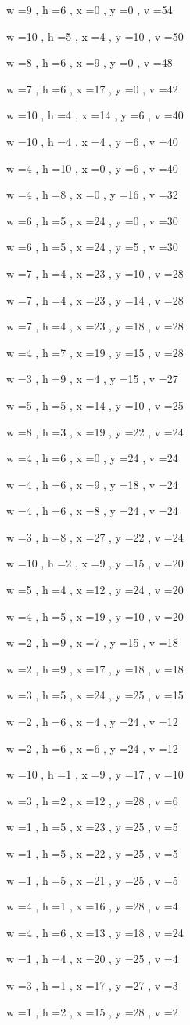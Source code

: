 \documentclass[11pt]{article}
\begin{document}
w =9 , h =6 , x =0 , y =0 , v =54
\par
w =10 , h =5 , x =4 , y =10 , v =50
\par
w =8 , h =6 , x =9 , y =0 , v =48
\par
w =7 , h =6 , x =17 , y =0 , v =42
\par
w =10 , h =4 , x =14 , y =6 , v =40
\par
w =10 , h =4 , x =4 , y =6 , v =40
\par
w =4 , h =10 , x =0 , y =6 , v =40
\par
w =4 , h =8 , x =0 , y =16 , v =32
\par
w =6 , h =5 , x =24 , y =0 , v =30
\par
w =6 , h =5 , x =24 , y =5 , v =30
\par
w =7 , h =4 , x =23 , y =10 , v =28
\par
w =7 , h =4 , x =23 , y =14 , v =28
\par
w =7 , h =4 , x =23 , y =18 , v =28
\par
w =4 , h =7 , x =19 , y =15 , v =28
\par
w =3 , h =9 , x =4 , y =15 , v =27
\par
w =5 , h =5 , x =14 , y =10 , v =25
\par
w =8 , h =3 , x =19 , y =22 , v =24
\par
w =4 , h =6 , x =0 , y =24 , v =24
\par
w =4 , h =6 , x =9 , y =18 , v =24
\par
w =4 , h =6 , x =8 , y =24 , v =24
\par
w =3 , h =8 , x =27 , y =22 , v =24
\par
w =10 , h =2 , x =9 , y =15 , v =20
\par
w =5 , h =4 , x =12 , y =24 , v =20
\par
w =4 , h =5 , x =19 , y =10 , v =20
\par
w =2 , h =9 , x =7 , y =15 , v =18
\par
w =2 , h =9 , x =17 , y =18 , v =18
\par
w =3 , h =5 , x =24 , y =25 , v =15
\par
w =2 , h =6 , x =4 , y =24 , v =12
\par
w =2 , h =6 , x =6 , y =24 , v =12
\par
w =10 , h =1 , x =9 , y =17 , v =10
\par
w =3 , h =2 , x =12 , y =28 , v =6
\par
w =1 , h =5 , x =23 , y =25 , v =5
\par
w =1 , h =5 , x =22 , y =25 , v =5
\par
w =1 , h =5 , x =21 , y =25 , v =5
\par
w =4 , h =1 , x =16 , y =28 , v =4
\par
w =4 , h =6 , x =13 , y =18 , v =24
\par
w =1 , h =4 , x =20 , y =25 , v =4
\par
w =3 , h =1 , x =17 , y =27 , v =3
\par
w =1 , h =2 , x =15 , y =28 , v =2
\par
\newpage
\end{document}
